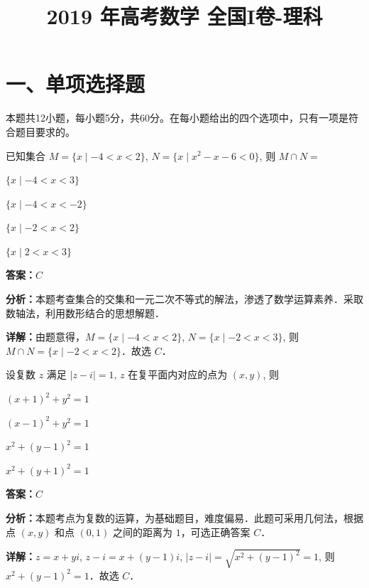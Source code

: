 ﻿\title{2019 年高考数学 全国I卷-理科}
\date{}
\maketitle

\section*{一、单项选择题}
本题共12小题，每小题5分，共60分。在每小题给出的四个选项中，只有一项是符合题目要求的。

\begin{question}[points=5]
已知集合 $M = \{x \mid -4 < x < 2\}$, $N = \{x \mid x^2 - x - 6 < 0\}$, 则 $M \cap N =$
\begin{choices}
  \item $\{x \mid -4 < x < 3\}$
  \item $\{x \mid -4 < x < -2\}$
  \item $\{x \mid -2 < x < 2\}$
  \item $\{x \mid 2 < x < 3\}$
\end{choices}
\begin{solution}
\textbf{答案：}$C$

\textbf{分析：}本题考查集合的交集和一元二次不等式的解法，渗透了数学运算素养．采取数轴法，利用数形结合的思想解题．

\textbf{详解：}由题意得，$M = \{x \mid -4 < x < 2\}$, $N = \{x \mid -2 < x < 3\}$, 则 $M \cap N = \{x \mid -2 < x < 2\}$．故选 $C$．
\end{solution}
\end{question}

\begin{question}[points=5]
设复数 $z$ 满足 $|z - i| = 1$, $z$ 在复平面内对应的点为 $(x, y)$, 则
\begin{choices}
  \item $(x + 1)^2 + y^2 = 1$
  \item $(x - 1)^2 + y^2 = 1$
  \item $x^2 + (y - 1)^2 = 1$
  \item $x^2 + (y + 1)^2 = 1$
\end{choices}
\begin{solution}
\textbf{答案：}$C$

\textbf{分析：}本题考点为复数的运算，为基础题目，难度偏易．此题可采用几何法，根据点 $(x, y)$ 和点 $(0, 1)$ 之间的距离为 $1$，可选正确答案 $C$．

\textbf{详解：}$z = x + yi$, $z - i = x + (y - 1)i$, $|z - i| = \sqrt{x^2 + (y - 1)^2} = 1$, 则 $x^2 + (y - 1)^2 = 1$．故选 $C$．
\end{solution}
\end{question}

